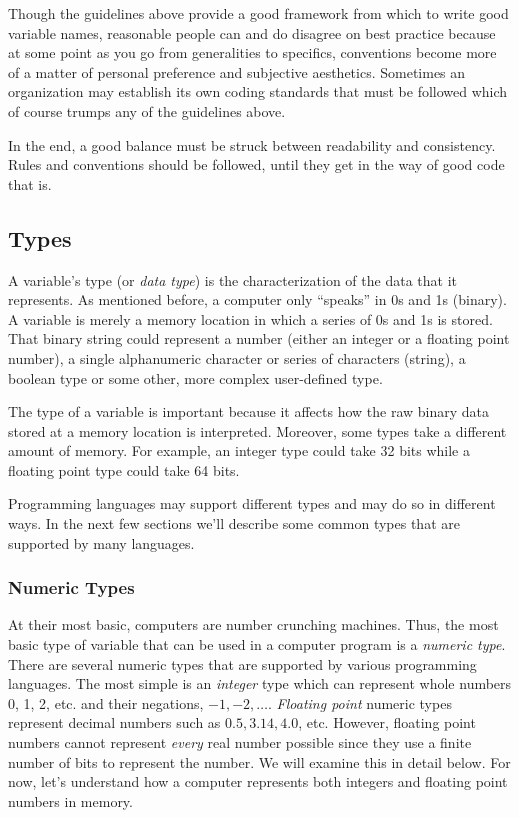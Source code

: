 Though the guidelines above provide a good framework from which to write good variable
names, reasonable people can and do disagree
on best practice because at some point as you go from generalities to specifics, conventions
become more of a matter of personal preference and subjective aesthetics.  Sometimes an
organization may establish its own coding standards that must be followed which of course 
trumps any of the guidelines above.

In the end, a good balance must be struck between readability and consistency.  Rules and
conventions should be followed, until they get in the way of good code that is.

\subsection{Types}

A variable's \gls{type} (or \emph{data type}) is the characterization of the data that it 
represents.  As mentioned before, a computer only ``speaks'' in 0s and 1s (binary).  
A variable is merely a memory location in which a series of 0s and 1s is stored.  That
binary string could represent a number (either an integer or a floating point number), 
a single alphanumeric character or series of characters (string), a boolean type or
some other, more complex user-defined type.  

The type of a variable is important because it affects 
how the raw binary data stored at a memory location is interpreted.  Moreover, some
types take a different amount of memory.  For example, an integer type could take
32 \glspl{bit} while a floating point type could take 64 \glspl{bit}.

Programming languages may support different types and may do so in different ways.
In the next few sections we'll describe some common types that are supported
by many languages.

\subsubsection{Numeric Types}

At their most basic, computers are number crunching machines.  Thus, the
most basic type of variable that can be used in a computer program is a
\emph{numeric type}.  There are several numeric types that are supported
by various programming languages.  The most simple is an \emph{integer}
type which can represent whole numbers 0, 1, 2, etc. and their negations, 
$-1, -2, \ldots$.  \emph{Floating point} numeric types represent decimal numbers
such as $0.5, 3.14, 4.0$, etc.  However, floating point numbers cannot 
represent \emph{every} real number possible since they use a finite
number of \glspl{bit} to represent the number.  We will examine this in
detail below.  For now, let's understand how a computer represents both
integers and floating point numbers in memory.

